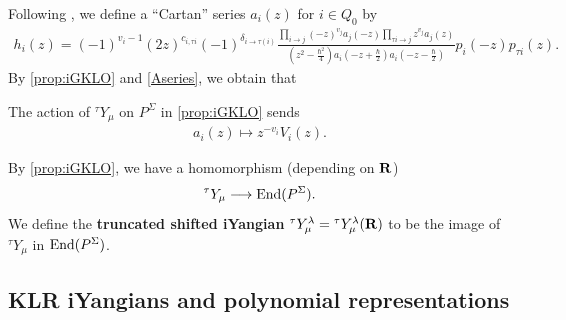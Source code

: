 Following \cite{KWWY14,LWW}, we define a “Cartan” series $a_i(z)$ for $i\in Q_0$ by
\begin{gather}
    \label{Aseries}
     h_i(z)= (-1)^{v_i-1}(2z)^{c_{i,\tau i}}(-1)^{\delta_{i\to \tau(i)}}\frac{\prod_{i\to j}(-z)^{v_{j}}a_{j}(-z)\prod_{\tau i \to j}z^{v_{j}}a_{j}(z)}{(z^2-\frac{\hbar^2}{4})a_i(-z+\frac{\hbar}{2})a_i(-z-\tfrac{\hbar}{2})}p_i(-z)p_{\tau i}(z).
\end{gather}
By \cref{prop:iGKLO} and \cref{Aseries}, we obtain that
\begin{corollary} \cite[Lem. 3.9]{LWW2}
     \label{iGKLO2} 
    The action of ${}^\tau Y_\mu $ on $P^\Sigma$ in \cref{prop:iGKLO} sends
    \begin{gather}
           \label{aiGKLO}
       a_i(z) \mapsto z^{-v_i} V_i(z).
    \end{gather}
\end{corollary}

By \cref{prop:iGKLO},  we have a homomorphism (depending on $\mathbf{R}$)
$$ {}^\tau Y_\mu \longrightarrow \operatorname{End}( P^\Sigma). $$
We define the {\bf truncated shifted iYangian} $ {}^\tau Y^\lambda_\mu = {}^\tau Y^\lambda_\mu(\mathbf{R}) $ to be the image of $ {}^\tau Y_\mu $ in $ \operatorname{End}(P^\Sigma)$. 


\subsection{KLR iYangians and polynomial representations}

 


